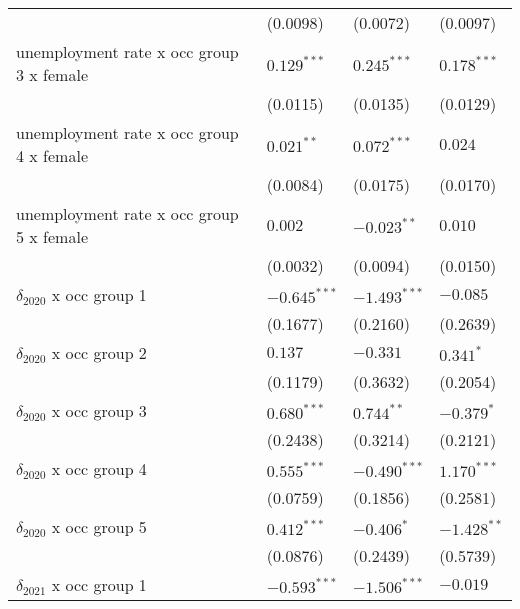 \begin{tabular}{llll}
                                         &           (0.0098) &           (0.0072) &           (0.0097) \\
unemployment rate x occ group 3 x female &      $0.129^{***}$ &      $0.245^{***}$ &      $0.178^{***}$ \\
                                         &           (0.0115) &           (0.0135) &           (0.0129) \\
unemployment rate x occ group 4 x female &       $0.021^{**}$ &      $0.072^{***}$ &            $0.024$ \\
                                         &           (0.0084) &           (0.0175) &           (0.0170) \\
unemployment rate x occ group 5 x female &            $0.002$ &      $-0.023^{**}$ &            $0.010$ \\
                                         &           (0.0032) &           (0.0094) &           (0.0150) \\
$\delta_{2020}$ x occ group 1            &     $-0.645^{***}$ &     $-1.493^{***}$ &           $-0.085$ \\
                                         &           (0.1677) &           (0.2160) &           (0.2639) \\
$\delta_{2020}$ x occ group 2            &            $0.137$ &           $-0.331$ &          $0.341^*$ \\
                                         &           (0.1179) &           (0.3632) &           (0.2054) \\
$\delta_{2020}$ x occ group 3            &      $0.680^{***}$ &       $0.744^{**}$ &         $-0.379^*$ \\
                                         &           (0.2438) &           (0.3214) &           (0.2121) \\
$\delta_{2020}$ x occ group 4            &      $0.555^{***}$ &     $-0.490^{***}$ &      $1.170^{***}$ \\
                                         &           (0.0759) &           (0.1856) &           (0.2581) \\
$\delta_{2020}$ x occ group 5            &      $0.412^{***}$ &         $-0.406^*$ &      $-1.428^{**}$ \\
                                         &           (0.0876) &           (0.2439) &           (0.5739) \\
$\delta_{2021}$ x occ group 1            &     $-0.593^{***}$ &     $-1.506^{***}$ &           $-0.019$ \\

\end{tabular}
